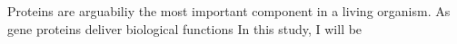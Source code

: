 Proteins are arguabiliy the most important component in a living organism. As gene  proteins deliver biological functions   In this study, I will be 